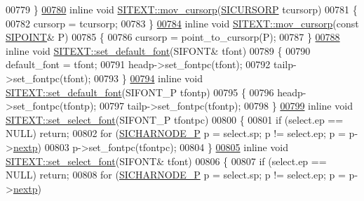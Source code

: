 \begin{DoxyCode}
00779 \}
\hyperlink{class_s_i_t_e_x_t_a79c57242ea31d6792f319aaf5ac8d8f0}{00780} \textcolor{keyword}{inline} \textcolor{keywordtype}{void} \hyperlink{class_s_i_t_e_x_t_a79c57242ea31d6792f319aaf5ac8d8f0}{SITEXT::mov\_cursorp}(\hyperlink{class_s_i_c_h_a_r_n_o_d_e}{SICURSORP} tcursorp)
00781 \{
00782     cursorp = tcursorp;
00783 \}
\hyperlink{class_s_i_t_e_x_t_a4542e94a4f3d3e4d47983bf051dc7ec4}{00784} \textcolor{keyword}{inline} \textcolor{keywordtype}{void} \hyperlink{class_s_i_t_e_x_t_a79c57242ea31d6792f319aaf5ac8d8f0}{SITEXT::mov\_cursorp}(\textcolor{keyword}{const} \hyperlink{struct_s_i_p_o_i_n_t}{SIPOINT}& P)
00785 \{
00786     cursorp = point\_to\_cursorp(P);
00787 \}
\hyperlink{class_s_i_t_e_x_t_a3e04be8b17cd6702fc52158f9b3b276b}{00788} \textcolor{keyword}{inline} \textcolor{keywordtype}{void} \hyperlink{class_s_i_t_e_x_t_a3e04be8b17cd6702fc52158f9b3b276b}{SITEXT::set\_default\_font}(SIFONT& tfont)
00789 \{
00790     default\_font = tfont;
00791     headp->set\_fontpc(tfont);
00792     tailp->set\_fontpc(tfont);
00793 \}
\hyperlink{class_s_i_t_e_x_t_a8fcd320042283b60f57630bdb8fd5bc8}{00794} \textcolor{keyword}{inline} \textcolor{keywordtype}{void} \hyperlink{class_s_i_t_e_x_t_a3e04be8b17cd6702fc52158f9b3b276b}{SITEXT::set\_default\_font}(SIFONT\_P tfontp)
00795 \{
00796     headp->set\_fontpc(tfontp);
00797     tailp->set\_fontpc(tfontp);
00798 \}
\hyperlink{class_s_i_t_e_x_t_a4e33142038f2ba1d42660dec1134d2f9}{00799} \textcolor{keyword}{inline} \textcolor{keywordtype}{void} \hyperlink{class_s_i_t_e_x_t_a4e33142038f2ba1d42660dec1134d2f9}{SITEXT::set\_select\_font}(SIFONT\_P tfontpc)
00800 \{
00801     \textcolor{keywordflow}{if} (select.ep == NULL) \textcolor{keywordflow}{return};
00802     \textcolor{keywordflow}{for} (\hyperlink{class_s_i_c_h_a_r_n_o_d_e}{SICHARNODE\_P} p = select.sp; p != select.ep; p = p->\hyperlink{class_s_i_c_h_a_r_n_o_d_e_ab188ae5c7731bcc66a1042defcf158c8}{nextp})
00803         p->set\_fontpc(tfontpc);
00804 \}
\hyperlink{class_s_i_t_e_x_t_a2b1208eb0796a08112449e7273b271df}{00805} \textcolor{keyword}{inline} \textcolor{keywordtype}{void} \hyperlink{class_s_i_t_e_x_t_a4e33142038f2ba1d42660dec1134d2f9}{SITEXT::set\_select\_font}(SIFONT& tfont)
00806 \{
00807     \textcolor{keywordflow}{if} (select.ep == NULL) \textcolor{keywordflow}{return};
00808     \textcolor{keywordflow}{for} (\hyperlink{class_s_i_c_h_a_r_n_o_d_e}{SICHARNODE\_P} p = select.sp; p != select.ep; p = p->\hyperlink{class_s_i_c_h_a_r_n_o_d_e_ab188ae5c7731bcc66a1042defcf158c8}{nextp})

\end{DoxyCode}
